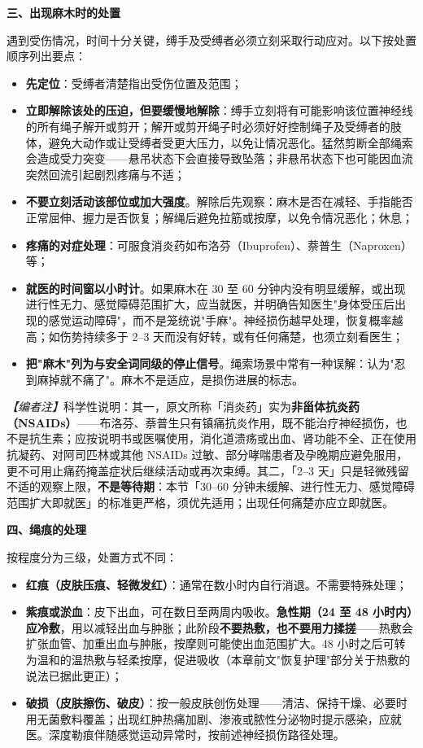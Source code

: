 \documentclass[12pt,UTF8]{ctexbook}
\begin{document}
\textbf{三、出现麻木时的处置}

遇到受伤情况，时间十分关键，缚手及受缚者必须立刻采取行动应对。以下按处置顺序列出要点：

\begin{itemize}
\item \textbf{先定位}：受缚者清楚指出受伤位置及范围；
\item \textbf{立即解除该处的压迫，但要缓慢地解除}：缚手立刻将有可能影响该位置神经线的所有绳子解开或剪开；解开或剪开绳子时必须好好控制绳子及受缚者的肢体，避免大动作或让受缚者受更大压力，以免让情况恶化。猛然剪断全部绳索会造成受力突变——悬吊状态下会直接导致坠落；非悬吊状态下也可能因血流突然回流引起剧烈疼痛与不适；
\item \textbf{不要立刻活动该部位或加大强度}。解除后先观察：麻木是否在减轻、手指能否正常屈伸、握力是否恢复；解绳后避免拉筋或按摩，以免令情况恶化；休息；
\item \textbf{疼痛的对症处理}：可服食消炎药如布洛芬（Ibuprofen）、萘普生（Naproxen）等；
\item \textbf{就医的时间窗以小时计}。如果麻木在 30 至 60 分钟内没有明显缓解，或出现进行性无力、感觉障碍范围扩大，应当就医，并明确告知医生"身体受压后出现的感觉运动障碍"，而不是笼统说"手麻"。神经损伤越早处理，恢复概率越高；如伤势持续多于 2--3 天而没有好转，或有任何痛楚，也须立刻看医生；
\item \textbf{把"麻木"列为与安全词同级的停止信号}。绳索场景中常有一种误解：认为"忍到麻掉就不痛了"。麻木不是适应，是损伤进展的标志。
\end{itemize}

\noindent\textit{【编者注】}科学性说明：其一，原文所称「消炎药」实为\textbf{非甾体抗炎药（NSAIDs）}——布洛芬、萘普生只有镇痛抗炎作用，既不能治疗神经损伤，也不是抗生素；应按说明书或医嘱使用，消化道溃疡或出血、肾功能不全、正在使用抗凝药、对阿司匹林或其他 NSAIDs 过敏、部分哮喘患者及孕晚期应避免服用，更不可用止痛药掩盖症状后继续活动或再次束缚。其二，「2--3 天」只是轻微残留不适的观察上限，\textbf{不是等待期}：本节「30--60 分钟未缓解、进行性无力、感觉障碍范围扩大即就医」的标准更严格，须优先适用；出现任何痛楚亦应立即就医。

\textbf{四、绳痕的处理}

按程度分为三级，处置方式不同：

\begin{itemize}
\item \textbf{红痕（皮肤压痕、轻微发红）}：通常在数小时内自行消退。不需要特殊处理；
\item \textbf{紫痕或淤血}：皮下出血，可在数日至两周内吸收。\textbf{急性期（24 至 48 小时内）应冷敷}，用以减轻出血与肿胀；此阶段\textbf{不要热敷，也不要用力揉搓}——热敷会扩张血管、加重出血与肿胀，按摩则可能使出血范围扩大。48 小时之后可转为温和的温热敷与轻柔按摩，促进吸收（本章前文"恢复护理"部分关于热敷的说法已据此更正）；
\item \textbf{破损（皮肤擦伤、破皮）}：按一般皮肤创伤处理——清洁、保持干燥、必要时用无菌敷料覆盖；出现红肿热痛加剧、渗液或脓性分泌物时提示感染，应就医。深度勒痕伴随感觉运动异常时，按前述神经损伤路径处理。
\end{itemize}
\end{document}
